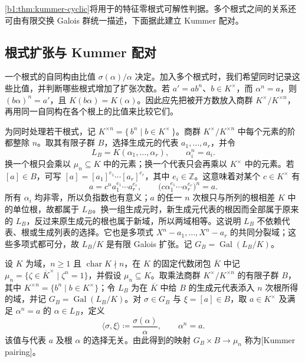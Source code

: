 \cref{b1:thm:kummer-cyclic}将用于的特征零根式可解性判据。多个根式之间的关系还可由有限交换 Galois 群统一描述，下面据此建立 Kummer 配对。

\subsection{根式扩张与 Kummer 配对}
\label{b1:subsec:2003:02}

一个根式的自同构由比值 \(\sigma(\alpha)/\alpha\) 决定。加入多个根式时，我们希望同时记录这些比值，并判断哪些根式增加了扩张次数。若 \(a'=ab^n\)、\(b\in K^\times\)，而 \(\alpha^n=a\)，则 \((b\alpha)^n=a'\)，且 \(K(b\alpha)=K(\alpha)\)。因此应先把被开方数放入商群 \(K^\times/K^{\times n}\)，再用同一自同构在各个根上的比值来比较它们。

\ProseParagraphBreak
为同时处理若干根式，记 \(K^{\times n}=\{\,b^n\mid b\in K^\times\,\}\)。商群 \(K^\times/K^{\times n}\) 中每个元素的阶都整除 \(n\)。取其有限子群 \(B\)，选择生成元的代表 \(a_1,\ldots,a_r\)，并令
\[
	L_B=K(\alpha_1,\ldots,\alpha_r),\qquad\alpha_i^n=a_i.
\]
换一个根只会乘以 \(\mu_n\subseteq K\) 中的元素；换一个代表只会再乘以 \(K^\times\) 中的元素。若 \([a]\in B\)，可写 \([a]=[a_1]^{e_1}\cdots[a_r]^{e_r}\)，其中 \(e_i\in\mathbb Z\)。这意味着对某个 \(c\in K^\times\) 有
\[
	a=c^n a_1^{e_1}\cdots a_r^{e_r},\qquad \bigl(c\alpha_1^{e_1}\cdots\alpha_r^{e_r}\bigr)^n=a.
\]
所有 \(\alpha_i\) 均非零，所以负指数也有意义；\(a\) 的任一 \(n\) 次根只与所列的根相差 \(K\) 中的单位根，故都属于 \(L_B\)。换一组生成元时，新生成元代表的根因而全部属于原来的 \(L_B\)，反过来原生成元的根也属于新域，所以两域相等。这说明 \(L_B\) 不依赖代表、根或生成列表的选择。它也是多项式 \(X^n-a_1,\ldots,X^n-a_r\) 的共同分裂域；这些多项式都可分，故 \(L_B/K\) 是有限 Galois 扩张。记 \(G_B=\operatorname{Gal}(L_B/K)\)。

\begin{definition}\label{b1:def:kummer-pairing}
	设 \(K\) 为域，\(n\geq1\) 且 \(\operatorname{char}K\nmid n\)，在 \(K\) 的固定代数闭包 \(\overline K\) 中记 \(\mu_n=\{\zeta\in\overline K^\times\mid\zeta^n=1\}\)，并假设 \(\mu_n\subseteq K\)。取乘法商群 \(K^\times/K^{\times n}\) 的有限子群 \(B\)，其中 \(K^{\times n}=\{b^n\mid b\in K^\times\}\)；令 \(L_B\) 为在 \(\overline K\) 中给 \(B\) 的生成元代表添入 \(n\) 次根所得的域，并记 \(G_B=\operatorname{Gal}(L_B/K)\)。对 \(\sigma\in G_B\) 与 \(\xi=[a]\in B\)，取 \(a\in K^\times\) 及满足 \(\alpha^n=a\) 的 \(\alpha\in L_B\)，定义
	\[
		\langle\sigma,\xi\rangle\coloneqq\frac{\sigma(\alpha)}{\alpha}, \qquad \alpha^n=a.
	\]
	该值与代表 \(a\) 及根 \(\alpha\) 的选择无关。由此得到的映射 \(G_B\times B\rightarrow\mu_n\) 称为[Kummer pairing]。
\end{definition}


